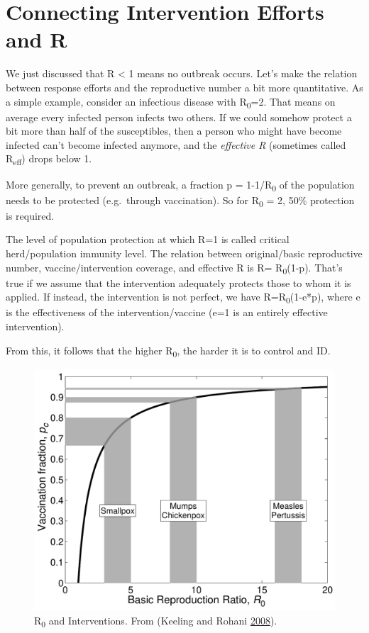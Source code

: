 \documentclass[]{book}
\theoremstyle{definition}
\theoremstyle{definition}
\theoremstyle{definition}
\theoremstyle{remark}
\begin{document}
\section{Connecting Intervention Efforts and
R}\label{connecting-intervention-efforts-and-r}

We just discussed that R \textless{} 1 means no outbreak occurs. Let's
make the relation between response efforts and the reproductive number a
bit more quantitative. As a simple example, consider an infectious
disease with R\textsubscript{0}=2. That means on average every infected
person infects two others. If we could somehow protect a bit more than
half of the susceptibles, then a person who might have become infected
can't become infected anymore, and the \emph{effective R} (sometimes
called R\textsubscript{eff}) drops below 1.

More generally, to prevent an outbreak, a fraction p =
1-1/R\textsubscript{0} of the population needs to be protected
(e.g.~through vaccination). So for R\textsubscript{0} = 2, 50\%
protection is required.

The level of population protection at which R=1 is called critical
herd/population immunity level. The relation between original/basic
reproductive number, vaccine/intervention coverage, and effective R is
R= R\textsubscript{0}(1-p). That's true if we assume that the
intervention adequately protects those to whom it is applied. If
instead, the intervention is not perfect, we have
R=R\textsubscript{0}(1-e*p), where e is the effectiveness of the
intervention/vaccine (e=1 is an entirely effective intervention).

From this, it follows that the higher R\textsubscript{0}, the harder it
is to control and ID.

\begin{figure}
\centering
\includegraphics{./images/kr-R0intervention.pdf}
\caption{\label{fig:krR0intervention}R\textsubscript{0} and Interventions.
From (Keeling and Rohani \protect\hyperlink{ref-keeling08}{2008}).}
\end{figure}
\end{document}
